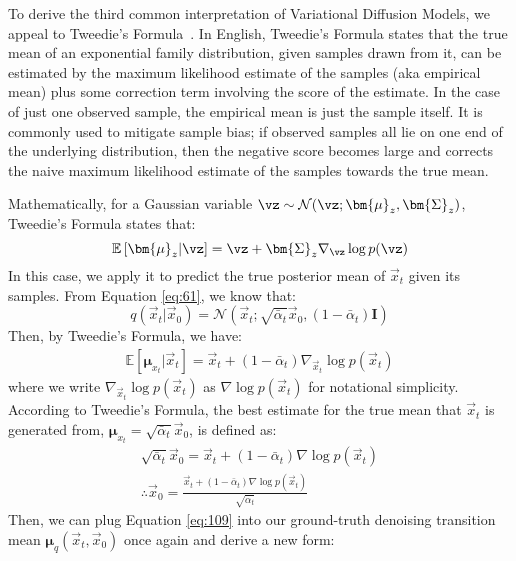 To derive the third common interpretation of Variational Diffusion Models, we appeal to Tweedie's Formula~\cite{efron2011tweedie}.  In English, Tweedie's Formula states that the true mean of an exponential family distribution, given samples drawn from it, can be estimated by the maximum likelihood estimate of the samples (aka empirical mean) plus some correction term involving the score of the estimate.  In the case of just one observed sample, the empirical mean is just the sample itself.  It is commonly used to mitigate sample bias; if observed samples all lie on one end of the underlying distribution, then the negative score becomes large and corrects the naive maximum likelihood estimate of the samples towards the true mean.

Mathematically, for a Gaussian variable $\vz \sim \mathcal{N}(\vz;\bm{\mu}_z, \bm{\Sigma}_z)$, Tweedie's Formula states that: 
$$\mathbb{E}\left[\bm{\mu}_z|\vz\right] = \vz + \bm{\Sigma}_z\nabla_\vz\log p(\vz)$$
In this case, we apply it to predict the true posterior mean of $\vec{x}_t$ given its samples.  From Equation \ref{eq:61}, we know that:
$$q(\vec{x}_t|\vec{x}_0) = \mathcal{N}(\vec{x}_{t} ; \sqrt{\bar\alpha_t}\vec{x}_0, \left(1 - \bar\alpha_t\right)\textbf{I})$$
Then, by Tweedie's Formula, we have:
\begin{align}
\mathbb{E}\left[\bm{\mu}_{x_t}|\vec{x}_t\right] = \vec{x}_t + (1 - \bar\alpha_t)\nabla_{\vec{x}_t}\log p(\vec{x}_t)
\end{align}
where we write $\nabla_{\vec{x}_t}\log p(\vec{x}_t)$ as $\nabla\log p(\vec{x}_t)$ for notational simplicity.
According to Tweedie’s Formula, the best estimate for the true mean that $\vec{x}_t$ is generated from, $\bm{\mu}_{x_t} = \sqrt{\bar\alpha_t}\vec{x}_0$, is defined as:
\begin{align}
    \sqrt{\bar\alpha_t}\vec{x}_0 = \vec{x}_t + (1 - \bar\alpha_t)\nabla\log p(\vec{x}_t)\\
    \therefore \vec{x}_0 = \frac{\vec{x}_t + (1 - \bar\alpha_t)\nabla\log p(\vec{x}_t)}{\sqrt{\bar\alpha_t}} \label{eq:109}
\end{align}
Then, we can plug Equation \ref{eq:109} into our ground-truth denoising transition mean $\bm{\mu}_q(\vec{x}_t, \vec{x}_0)$ once again and derive a new form:
